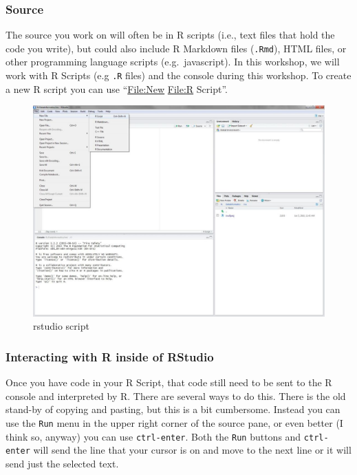 \documentclass[]{article}
\begin{document}
\hypertarget{source}{%
\subsubsection{Source}\label{source}}

The source you work on will often be in R scripts (i.e., text files that
hold the code you write), but could also include R Markdown files
(\texttt{.Rmd}), HTML files, or other programming language scripts
(e.g.~javascript). In this workshop, we will work with R Scripts (e.g
\texttt{.R} files) and the console during this workshop. To create a new
R script you can use ``\url{File:New} \url{File:R} Script''.

\begin{figure}
\centering
\includegraphics{figures/rstudio_script.jpg}
\caption{rstudio script}
\end{figure}

\hypertarget{interacting-with-r-inside-of-rstudio}{%
\subsubsection{Interacting with R inside of
RStudio}\label{interacting-with-r-inside-of-rstudio}}

Once you have code in your R Script, that code still need to be sent to
the R console and interpreted by R. There are several ways to do this.
There is the old stand-by of copying and pasting, but this is a bit
cumbersome. Instead you can use the \texttt{Run} menu in the upper right
corner of the source pane, or even better (I think so, anyway) you can
use \texttt{ctrl-enter}. Both the \texttt{Run} buttons and
\texttt{ctrl-enter} will send the line that your cursor is on and move
to the next line or it will send just the selected text.
\end{document}
